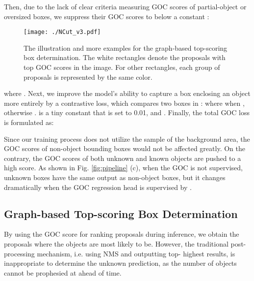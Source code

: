 \documentclass[10pt,twocolumn,letterpaper]{article}
\begin{document}
Then, due to the lack of clear criteria measuring GOC scores of partial-object or oversized boxes,
we suppress their GOC scores to below a constant :
\begin{figure*}
\centering
\texttt{[image: ./NCut\_v3.pdf]}
\vspace{-5pt}
\caption{The illustration and more examples for the graph-based top-scoring box determination.
The white rectangles denote the proposals with top GOC scores in the image.
For other rectangles,
each group of proposals is represented by the same color.}
\vspace{-10pt}
\label{fig:ncut}
\end{figure*}

{\setlength\abovedisplayskip{0.18cm}
\setlength\belowdisplayskip{0.18cm}
}where .
Next,
we improve the model's ability to capture a box enclosing an object more entirely by a contrastive loss,
which compares two boxes in :
{\setlength\abovedisplayskip{0.18cm}
\setlength\belowdisplayskip{0.18cm}
}where  when ,
otherwise .
 is a tiny constant that is set to 0.01,
and .
Finally, the total GOC loss is formulated as:
{\setlength\abovedisplayskip{0.18cm}
\setlength\belowdisplayskip{0.18cm}
}

Since our training process does not utilize the sample of the background area,
the GOC scores of non-object bounding boxes would not be affected greatly.
On the contrary, the GOC scores of both unknown and known objects are pushed to a high score.
As shown in Fig. \ref{fig:pipeline} (c),
when the GOC is not supervised,
unknown boxes have the same output as non-object boxes,
but it changes dramatically when the GOC regression head is supervised by .



\subsection{Graph-based Top-scoring Box Determination}
\label{sec:Ncut}
By using the GOC score for ranking proposals during inference,
we obtain the proposals where the objects are most likely to be.
However,
the traditional post-processing mechanism, i.e. using NMS and outputting top- highest results, is inappropriate to determine the unknown prediction,
as the number of objects cannot be prophesied at ahead of time.
\end{document}
